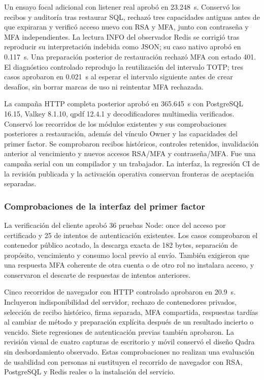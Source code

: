 Un ensayo focal adicional con listener real aprobó en 23.248~s. Conservó los
recibos y auditoría tras restaurar SQL, rechazó tres capacidades antiguas antes
de que expiraran y verificó acceso nuevo con RSA y MFA, junto con contraseña
y MFA independientes. La lectura INFO del observador Redis se corrigió tras
reproducir su interpretación indebida como JSON; su caso nativo aprobó en
0.117~s. Una preparación posterior de restauración rechazó MFA con estado 401.
El diagnóstico controlado reprodujo la reutilización del intervalo TOTP;
tres casos aprobaron en 0.021~s al esperar el intervalo siguiente antes de
crear desafíos, sin borrar marcas de uso ni reintentar MFA rechazada.


La campaña HTTP completa posterior aprobó en 365.645~s con PostgreSQL 16.15,
Valkey 8.1.10, qpdf 12.4.1 y decodificadores multimedia verificados. Conservó
los recorridos de los módulos existentes y sus comprobaciones posteriores a
restauración, además del vínculo Owner y las capacidades del primer factor.
Se comprobaron recibos históricos, controles retenidos, invalidación anterior al
vencimiento y nuevos accesos RSA/MFA y contraseña/MFA. Fue una campaña serial
con un compilador y un trabajador. La interfaz, la regresión CI de la revisión
publicada y la activación operativa conservan fronteras de aceptación separadas.

\subsubsection{Comprobaciones de la interfaz del primer factor}

La verificación del cliente aprobó 36 pruebas Node: once del acceso por
certificado y 25 de intentos de autenticación existentes. Los casos comprobaron
el contenedor público acotado, la descarga exacta de 182 bytes, separación de
propósito, vencimiento y consumo local previo al envío. También exigieron que
una respuesta MFA coherente de otra cuenta o de otro rol no instalara acceso,
y conservaron el descarte de respuestas de intentos anteriores.

Cinco recorridos de navegador con HTTP controlado aprobaron en 20.9~s. Incluyeron
indisponibilidad del servidor, rechazo de contenedores privados, selección de
recibo histórico, firma separada, MFA compartida, respuestas tardías al cambiar
de método y preparación explícita después de un resultado incierto o vencido.
Siete regresiones de autenticación previas también aprobaron. La revisión visual
de cuatro capturas de escritorio y móvil conservó el diseño Qadra sin
desbordamiento observado. Estas comprobaciones no realizan una evaluación de
usabilidad con personas ni sustituyen el recorrido de navegador con RSA,
PostgreSQL y Redis reales o la instalación del servicio.

